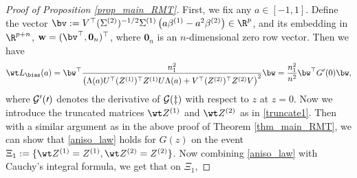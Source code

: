 \documentclass[aos,preprint]{imsart}
\begin{document}
\begin{proof}[Proof of Proposition \ref{prop_main_RMT}]
First, we fix any $a\in [ -1,1]$. Define the vector $\bv:=V^\top  (\Sigma^{(2)})^{-1/2} \Sigma^{(1)}\left(a\beta^{(1)}- a^2\beta^{(2)}\right)\in \R^{p}$, and its embedding in $\R^{p+n}$, $\mathbf w =(\bv^\top, \mathbf 0_n)^\top$, where $\mathbf 0_n$ is an $n$-dimensional zero row vector. Then we have$$ \wt L_{\bias} (a)= \bw^\top \frac{n_1^2}{\left( \Lambda(a) U^\top (Z^{(1)})^\top Z^{(1)} U\Lambda(a)  + V^\top (Z^{(2)})^\top Z^{(2)}V\right)^2} \bw= \frac{n^2_1}{n^2}\bw^\top G'(0) \bw,$$
where $\cal G'(0)$ denotes the derivative of $\cal G(z)$ with respect to $z$ at $z=0$. Now we introduce the truncated matrices $\wt Z^{(1)}$ and $\wt Z^{(2)}$ as in \eqref{truncate1}. Then with a similar argument as in the above proof of Theorem \ref{thm_main_RMT}, we can show that \eqref{aniso_law} holds  
 for $G(z)$ on the event $\Xi_1:=\{\wt Z^{(1)} = Z^{(1)},  \wt Z^{(2)} = Z^{(2)}\}$. 
Now combining \eqref{aniso_law} with Cauchy's integral formula, we get that on $\Xi_1$, %

\end{proof}
\end{document}
